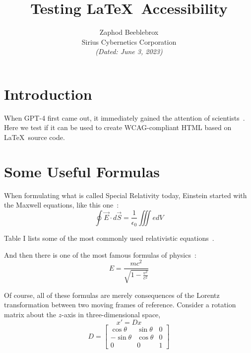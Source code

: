 \documentclass[10pt,twocolumn]{article}
\begin{document}
\title{Testing \LaTeX\ Accessibility}
\author{Zaphod Beeblebrox \\
Sirius Cybernetics Corporation \\
\textit{(Dated: June 3, 2023)}}
\date{}

\maketitle

\section{Introduction}

When GPT-4 first came out, it immediately gained the attention of scientists~\cite{ref1}. Here we test if it can be used to create WCAG-compliant HTML based on \LaTeX\ source code.

\section{Some Useful Formulas}

When formulating what is called Special Relativity today, Einstein started with the Maxwell equations, like this one~\cite{ref3}:
\begin{equation}
\oint \vec{E} \cdot d\vec{S} = \frac{1}{\epsilon_0} \iiint edV
\end{equation}

Table I lists some of the most commonly used relativistic equations~\cite{ref3}.

And then there is one of the most famous formulas of physics~\cite{ref4}:
\begin{equation}
E = \frac{mc^2}{\sqrt{1 - \frac{v^2}{c^2}}}
\end{equation}

Of course, all of these formulas are merely consequences of the Lorentz transformation between two moving frames of reference. Consider a rotation matrix about the $z$-axis in three-dimensional space,
\begin{equation}
x' = Dx
\end{equation}
\begin{equation}
D = 
\begin{bmatrix}
\cos \theta & \sin \theta & 0 \\
-\sin \theta & \cos \theta & 0 \\
0 & 0 & 1
\end{bmatrix}
\end{equation}
\end{document}
